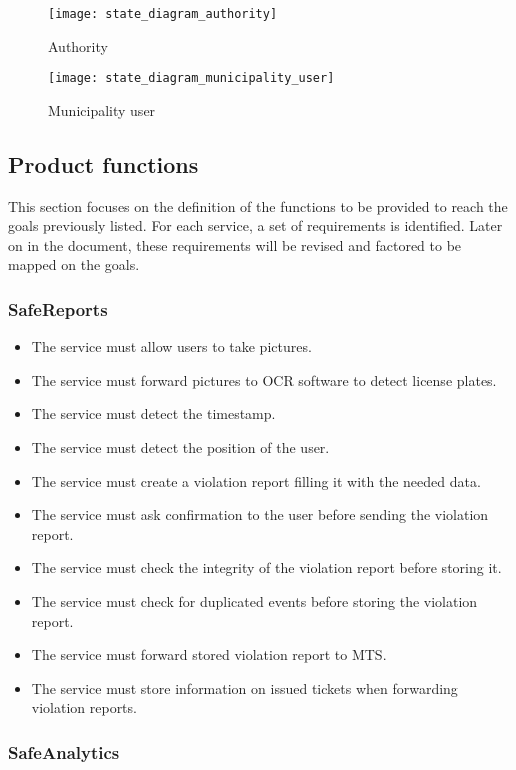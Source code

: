 \documentclass[./main.tex]{subfiles}
\begin{document}
\begin{figure}[H]
\centering
\texttt{[image: state\_diagram\_authority]}
\caption{Authority}
\end{figure}

\begin{figure}[H]
\centering
\texttt{[image: state\_diagram\_municipality\_user]}
\caption{Municipality user}
\end{figure}

\subsection{Product functions}

This section focuses on the definition of the functions to be provided
to reach the goals previously listed. For each service, a set of
requirements is identified. Later on in the document, these requirements
will be revised and factored to be mapped on the goals.

\subsubsection{SafeReports}

\begin{itemize}
\item
  The service must allow users to take pictures.
\item
  The service must forward pictures to OCR software to detect license
  plates.
\item
  The service must detect the timestamp.
\item
  The service must detect the position of the user.
\item
  The service must create a violation report filling it with the needed
  data.
\item
  The service must ask confirmation to the user before sending the
  violation report.
\item
  The service must check the integrity of the violation report before
  storing it.
\item
  The service must check for duplicated events before storing the
  violation report.
\item
  The service must forward stored violation report to MTS.
\item
  The service must store information on issued tickets when forwarding
  violation reports.
\end{itemize}

\subsubsection{SafeAnalytics}
\end{document}
